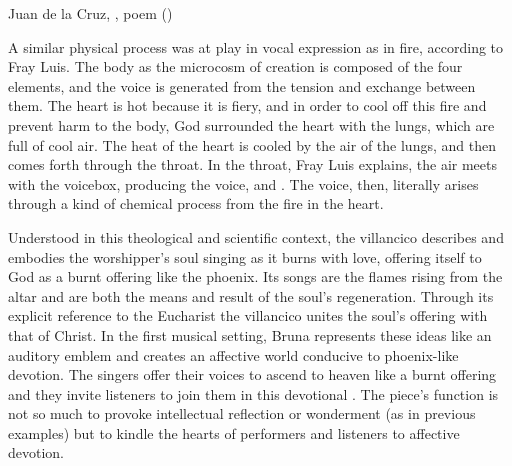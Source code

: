 
{Juan de la Cruz, , poem ()}

A similar physical process was at play in vocal expression as in fire,
according to Fray Luis.
The body as the microcosm of creation is composed of the four elements, and the
voice is generated from the tension and exchange between them.
The heart is hot because it is fiery, and in order to cool off this fire and
prevent harm to the body, God surrounded the heart with the lungs, which are
full of cool air. 
The heat of the heart is cooled by the air of the lungs, and then comes forth
through the throat.
In the throat, Fray Luis explains, the air meets with the voicebox, producing
the voice, and .%
    \Autocite[435]{LuisdeGranada:Simbolo}
The voice, then, literally arises through a kind of chemical process from the
fire in the heart.

	
Understood in this theological and scientific context, the villancico
 describes and embodies the worshipper's soul singing
as it burns with love, offering itself to God as a burnt offering like the
phoenix.
Its songs are the flames rising from the altar and are both the means and
result of the soul's regeneration.
Through its explicit reference to the Eucharist the villancico unites the
soul's offering with that of Christ.
In the first musical setting, Bruna represents these ideas like an auditory
emblem and creates an affective world conducive to phoenix-like devotion.
The singers offer their voices to ascend to heaven like a burnt offering and
they invite listeners to join them in this devotional .
The piece's function is not so much to provoke intellectual reflection or
wonderment (as in previous examples) but to kindle the hearts of performers and
listeners to affective devotion.


